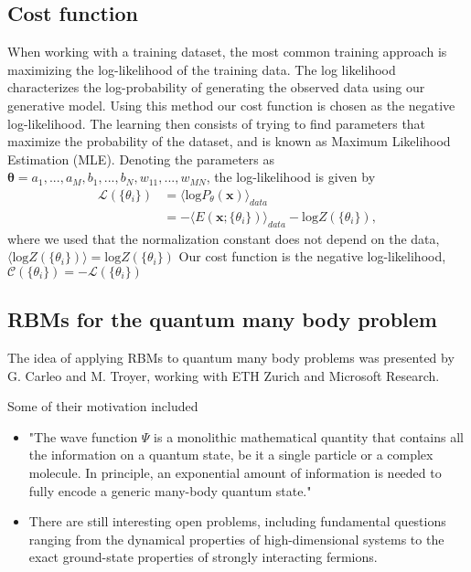 \documentclass[aip,jcp,reprint,floatfix]{revtex4-1}
\begin{document}
\begin{itemize}
\subsection*{Cost function}

When working with a training dataset, the most common training approach is maximizing the log-likelihood of the training data. The log likelihood characterizes the log-probability of generating the observed data using our generative model. Using this method our cost function is chosen as the negative log-likelihood. The learning then consists of trying to find parameters that maximize the probability of the dataset, and is known as Maximum Likelihood Estimation (MLE).
Denoting the parameters as $\bm{\theta} = a_1,...,a_M,b_1,...,b_N,w_{11},...,w_{MN}$, the log-likelihood is given by
\begin{align}
	\mathcal{L}(\{ \theta_i \}) &= \langle \text{log} P_\theta(\bm{x}) \rangle_{data} \\
	&= - \langle E(\bm{x}; \{ \theta_i\}) \rangle_{data} - \text{log} Z(\{ \theta_i\}),
\end{align}
where we used that the normalization constant does not depend on the data, $\langle \text{log} Z(\{ \theta_i\}) \rangle = \text{log} Z(\{ \theta_i\})$
Our cost function is the negative log-likelihood, $\mathcal{C}(\{ \theta_i \}) = - \mathcal{L}(\{ \theta_i \})$

\subsection*{RBMs for the quantum many body problem}

The idea of applying RBMs to quantum many body problems was presented by G. Carleo and M. Troyer, working with ETH Zurich and Microsoft Research.

Some of their motivation included

\begin{itemize}
\item "The wave function $\Psi$ is a monolithic mathematical quantity that contains all the information on a quantum state, be it a single particle or a complex molecule. In principle, an exponential amount of information is needed to fully encode a generic many-body quantum state."

\item There are still interesting open problems, including fundamental questions ranging from the dynamical properties of high-dimensional systems to the exact ground-state properties of strongly interacting fermions.


\end{itemize}
\end{itemize}
\end{document}
